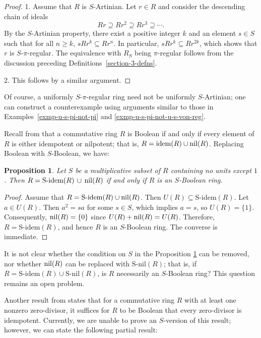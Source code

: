 \documentclass[12pt]{article}
\newtheorem{prop}[thm]{\bf Proposition}
\def\Sidem{\mathrm{S\text{-}idem}}
\def\Snil{\mathrm{S\text{-}nil}}
\def\idem{{\rm idem}}
\def\nil{{\rm nil}}
\begin{document}
\begin{proof}
1. Assume that \(R\) is \(S\)-Artinian. Let \(r \in R\) and consider the descending chain of ideals
\[
Rr \supseteq Rr^2 \supseteq Rr^3 \supseteq \cdots .
\]
By the \(S\)-Artinian property, there exist a positive integer \(k\) and an element \(s \in S\) such that for all \(n \geq k\), $sRr^k \subseteq Rr^n$. In particular, \(sRr^k \subseteq Rr^{2k}\), which shows that \(r\) is \(S\)-\(\pi\)-regular. The equivalence with \(R_S\) being \(\pi\)-regular follows from the discussion preceding Definitions~\ref{section-3-defns}.  

2. This follows by a similar argument.
\end{proof}


Of course, a uniformly $S$-$\pi$-regular ring need not be uniformly $S$-Artinian; one can construct a counterexample using arguments similar to those in Examples~\ref{exmp-u-s-pi-not-pi} and \ref{exmp-u-s-pi-not-u-s-von-reg}.


Recall from \cite[Theorem 2.6]{And1} that a commutative ring $R$ is Boolean if and only if every element of $R$ is either idempotent or nilpotent; that is,  $R = \idem(R) \cup \nil(R)$. Replacing Boolean with $S$-Boolean, we have:

\begin{prop}\label{s-idem-s-nil}
Let $S$ be a multiplicative subset of $R$ containing no units except $1$. Then $ R = \Sidem(R) \,\cup\, \nil(R)$ if and only if $R$ is an $S$-Boolean ring.
\end{prop}

\begin{proof}
Assume that $R = \Sidem(R) \cup \nil(R)$. Then $U(R) \subseteq \Sidem(R)$. Let $a \in U(R)$. Then $a^2 = sa$ for some $s \in S$, which implies $a = s$, so $U(R) = \{1\}$. Consequently, $\nil(R) = \{0\}$ since $U(R) + \nil(R) = U(R)$. Therefore, $R = \Sidem(R)$, and hence $R$ is an $S$-Boolean ring. The converse is immediate.
\end{proof}

 It is not clear  whether the condition on \(S\) in the Proposition \ref{s-idem-s-nil} can be removed, nor whether \(\nil(R)\) can be replaced with \(\Snil(R)\); that is, if \(R = \Sidem(R) \cup \Snil(R)\), is \(R\) necessarily an \(S\)-Boolean ring? This question remains an open problem.
 
 Another result from \cite[Theorem 2.7]{And1} states that for a commutative ring $R$ with at least one nonzero zero-divisor, it suffices for $R$ to be Boolean that every zero-divisor is idempotent. Currently, we are unable to prove an $S$-version of this result; however, we can state the following partial result:
\end{document}
